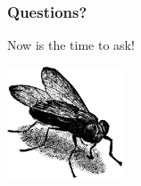 \documentclass{beamer}
\begin{document}
\begin{frame}
  \frametitle{Questions?}

  \begin{center}
    Now is the time to ask!
    \vfill

    \includegraphics[height=9em]{fly.png}
  \end{center}
\end{frame}
\end{document}
